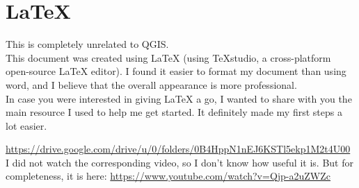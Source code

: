 \chapter{\LaTeX}

\pagestyle{fancy}
\fancyhf{}
\fancyhead[OC]{\leftmark}
\fancyhead[EC]{\rightmark}
\cfoot{\thepage}

This is completely unrelated to QGIS.\\

This document was created using \LaTeX{} (using TeXstudio, a cross-platform open-source \LaTeX{} editor). I found it easier to format my document than using word, and I believe that the overall appearance is more professional.\\

In case you were interested in giving \LaTeX{} a go, I wanted to share with you the main resource I used to help me get started. It definitely made my first steps a lot easier.

\url{https://drive.google.com/drive/u/0/folders/0B4HppN1nEJ6KSTl5ekp1M2t4U00}\\

I did not watch the corresponding video, so I don't know how useful it is. But for completeness, it is here:
\url{https://www.youtube.com/watch?v=Qjp-a2uZWZc}\\